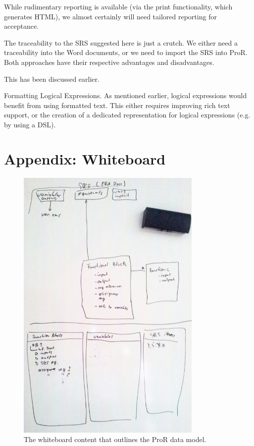 \documentclass{template/openetcs_article}
\begin{document}
\begin{description}

\item[Reporting.] While rudimentary reporting is available (via the print functionality, which generates HTML), we almost certainly will need tailored reporting for acceptance.

\item[SRS Traceability.]  The traceability to the SRS suggested here is just a crutch.  We either need a traceability into the Word documents, or we need to import the SRS into ProR.  Both approaches have their respective advantages and disadvantages.

\item[SysML/Papyrus Traceability.]  This has been discussed earlier.

\item{Formatting Logical Expressions.} As mentioned earlier, logical expressions would benefit from using formatted text.  This either requires improving rich text support, or the creation of a dedicated representation for logical expressions (e.g. by using a DSL).

\end{description}

\section{Appendix: Whiteboard}

\begin{figure}[h!t]
	\begin{center}
	\includegraphics[width=0.8\textwidth]{img/whiteboard.png}
	\end{center}
	\caption{The whiteboard content that outlines the ProR data model.}
	\label{fig:whiteboard}
\end{figure}


% 
% 


\end{document}
